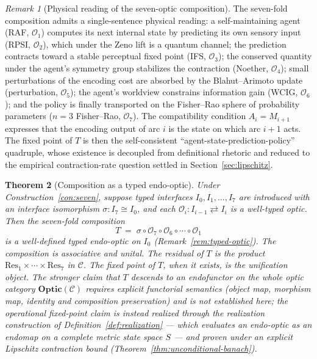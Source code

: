 \documentclass[11pt,a4paper]{article}
\theoremstyle{plain}
\newtheorem{theorem}{Theorem}[section]
\theoremstyle{definition}
\theoremstyle{remark}
\newtheorem{remark}[theorem]{Remark}
\newcommand{\OO}{\mathcal{O}}
\newcommand{\CC}{\mathcal{C}}
\newcommand{\Optic}{\mathbf{Optic}}
\begin{document}
\begin{remark}[Physical reading of the seven-optic composition]
\label{rem:optics-physical}
The seven-fold composition admits a single-sentence physical reading:
a self-maintaining agent (RAF, $\OO_1$) computes its next internal
state by predicting its own sensory input (RPSI, $\OO_2$), which under
the Zeno lift is a quantum channel; the prediction contracts toward a
stable perceptual fixed point (IFS, $\OO_3$); the conserved quantity
under the agent's symmetry group stabilizes the contraction (Noether,
$\OO_4$); small perturbations of the encoding cost are absorbed by the
Blahut--Arimoto update (perturbation, $\OO_5$); the agent's worldview
constrains information gain (WCIG, $\OO_6$); and the policy is finally
transported on the Fisher--Rao sphere of probability parameters
($n=3$ Fisher--Rao, $\OO_7$). The compatibility condition
$A_i = M_{i+1}$ expresses that the encoding output of arc $i$ is the
state on which arc $i+1$ acts. The fixed point of $T$ is then the
self-consistent ``agent-state-prediction-policy'' quadruple, whose
existence is decoupled from definitional rhetoric and reduced to the
empirical contraction-rate question settled in
Section~\ref{sec:lipschitz}.
\end{remark}

\begin{theorem}[Composition as a typed endo-optic]\label{thm:composition}
Under Construction~\ref{con:seven}, suppose typed interfaces
$I_0, I_1, \ldots, I_7$ are introduced with an interface isomorphism
$\sigma : I_7 \cong I_0$, and each $\OO_i : I_{i-1} \rightleftarrows I_i$
is a well-typed optic. Then the seven-fold composition
\begin{equation}\label{eq:comp}
  T \;=\; \sigma \circ \OO_7 \circ \OO_6 \circ \cdots \circ \OO_1
\end{equation}
is a well-defined \emph{typed endo-optic} on $I_0$ (Remark~\ref{rem:typed-optic}).
The composition is associative and unital. The residual of $T$ is the
product $\mathrm{Res}_1 \times \cdots \times \mathrm{Res}_7$ in $\CC$.
The fixed point of $T$, when it exists, is the \emph{unification object}.
The stronger claim that $T$ descends to an endofunctor on the whole
optic category $\Optic(\CC)$ requires explicit functorial semantics
(object map, morphism map, identity and composition preservation) and is
not established here; the operational fixed-point claim is instead
realized through the realization construction of
Definition~\ref{def:realization} --- which evaluates an endo-optic as
an endomap on a complete metric state space $S$ --- and proven under an
explicit Lipschitz contraction bound
(Theorem~\ref{thm:unconditional-banach}).
\end{theorem}
\end{document}
